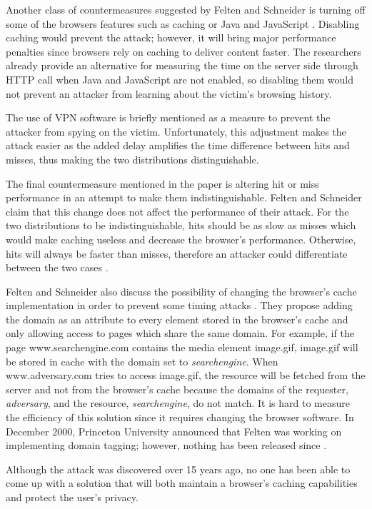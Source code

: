\documentclass[10pt,a4paper,twoside]{book}
\begin{document}
Another class of countermeasures suggested by Felten and Schneider is turning off some of the browsers features such as caching or Java and JavaScript \cite{felten2000timing}. Disabling caching would prevent the attack; however, it will bring major performance penalties since browsers rely on caching to deliver content faster. The researchers already provide an alternative for measuring the time on the server side through HTTP call when Java and JavaScript are not enabled, so disabling them would not prevent an attacker from learning about the victim's browsing history.

The use of VPN software is briefly mentioned as a measure to prevent the attacker from spying on the victim. Unfortunately, this adjustment makes the attack easier as the added delay amplifies the time difference between hits and misses, thus making the two distributions distinguishable. 

The final countermeasure mentioned in the paper is altering hit or miss performance in an attempt to make them indistinguishable. Felten and Schneider claim that this change does not affect the performance of their attack. For the two distributions to be indistinguishable, hits should be as slow as misses which would make caching useless and decrease the browser's performance. Otherwise, hits will always be faster than misses, therefore an attacker could differentiate between the two cases \cite{felten2000timing}. 

Felten and Schneider also discuss the possibility of changing the browser's cache implementation in order to prevent some timing attacks \cite{felten2000timing}. They propose adding the domain as an attribute to every element stored in the browser's cache and only allowing access to pages which share the same domain. For example, if the page www.searchengine.com contains the media element image.gif, image.gif will be stored in cache with the domain set to \textit{searchengine}. When www.adversary.com tries to access image.gif, the resource will be fetched from the server and not from the browser's cache because the domains of the requester, \textit{adversary}, and the resource, \textit{searchengine}, do not match. It is hard to measure the efficiency of this solution since it requires changing the browser software. In December 2000, Princeton University announced that Felten was working on implementing domain tagging; however, nothing has been released since \cite{princetonunifelten}.

Although the attack was discovered over 15 years ago, no one has been able to come up with a solution that will both maintain a browser's caching capabilities and protect the user's privacy.
\end{document}
